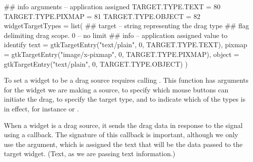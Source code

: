 \begin{Schunk}
\begin{Sinput}
 ## info arguments -- application assigned
 TARGET.TYPE.TEXT   = 80                 
 TARGET.TYPE.PIXMAP = 81                  
 TARGET.TYPE.OBJECT = 82
 widgetTargetTypes = list(
 ## target -- string representing the drag type
 ## flag delimiting drag scope. 0 -- no limit
 ## info -- application assigned value to identify
 text = gtkTargetEntry("text/plain", 0, TARGET.TYPE.TEXT),
 pixmap = gtkTargetEntry("image/x-pixmap", 0, TARGET.TYPE.PIXMAP),
 object = gtkTargetEntry("text/plain", 0, TARGET.TYPE.OBJECT)
 )
\end{Sinput}
\end{Schunk}

To set a widget to be a drag source requires calling
. This function has arguments
 for the widget we are making a
source,   to specify
which mouse buttons can initiate the drag,
 to specify the target type, and
 to indicate which of the
 types is in effect, for instance  or
. 

When a widget is a drag source, it sends the drag data in response to
the  signal using a callback. The signature of
this callback is important, although we only use the 
argument, which is assigned the text that will be the data passed to
the target widget. (Text, as we are passing text information.)

\begin{Schunk}
\end{Schunk}

